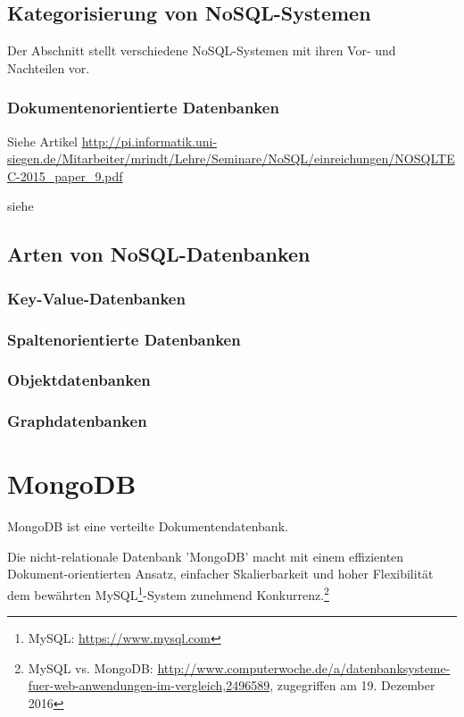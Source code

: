 \subsection{Kategorisierung von NoSQL-Systemen}
Der Abschnitt stellt verschiedene NoSQL-Systemen mit ihren Vor- und Nachteilen vor.
\subsubsection{Dokumentenorientierte Datenbanken}

Siehe Artikel \url{http://pi.informatik.uni-siegen.de/Mitarbeiter/mrindt/Lehre/Seminare/NoSQL/einreichungen/NOSQLTEC-2015_paper_9.pdf}

siehe \cite[S. 5-8]{Edlich.2011}

\subsection{Arten von NoSQL-Datenbanken}
\subsubsection{Key-Value-Datenbanken}
\subsubsection{Spaltenorientierte Datenbanken}
\subsubsection{Objektdatenbanken}
\subsubsection{Graphdatenbanken}



\section{MongoDB}\label{mongo}
MongoDB ist eine verteilte Dokumentendatenbank. 

Die nicht-relationale Datenbank 'MongoDB' macht mit einem effizienten Dokument-orientierten Ansatz, einfacher Skalierbarkeit und hoher Flexibilität dem bewährten MySQL\footnote{MySQL: \url{https://www.mysql.com}}-System zunehmend Konkurrenz.\footnote{MySQL vs. MongoDB: \url{http://www.computerwoche.de/a/datenbanksysteme-fuer-web-anwendungen-im-vergleich,2496589}, zugegriffen am 19. Dezember 2016}

